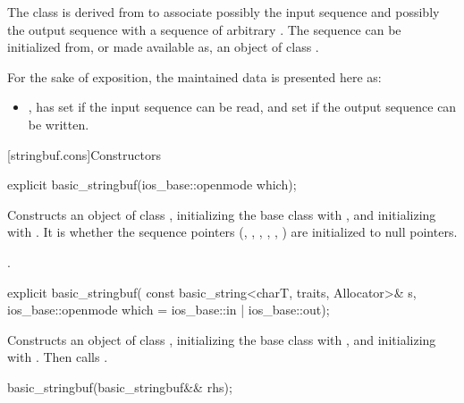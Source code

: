 \pnum
The class
is derived from
to associate possibly the input sequence and possibly
the output sequence with a sequence of arbitrary
.
The sequence can be initialized from, or made available as, an object of class
.

\pnum
For the sake of exposition, the maintained data is presented here as:
\begin{itemize}
\item
{},
has
set if the input sequence can be read, and
set if the output sequence can be written.
\end{itemize}

[stringbuf.cons]{Constructors}

%
\begin{itemdecl}
explicit basic_stringbuf(ios_base::openmode which);
\end{itemdecl}

\begin{itemdescr}
\pnum
\effects
Constructs an object of class
,
initializing the base class with
, and initializing
with .
It is
whether the sequence pointers
(, , ,
, , )
are initialized to null pointers.

\pnum
\ensures
{}.
\end{itemdescr}

%
\begin{itemdecl}
explicit basic_stringbuf(
  const basic_string<charT, traits, Allocator>& s,
  ios_base::openmode which = ios_base::in | ios_base::out);
\end{itemdecl}

\begin{itemdescr}
\pnum
\effects
Constructs an object of class
,
initializing the base class with
, and initializing
with .
Then calls .
\end{itemdescr}

%
\begin{itemdecl}
basic_stringbuf(basic_stringbuf&& rhs);
\end{itemdecl}

